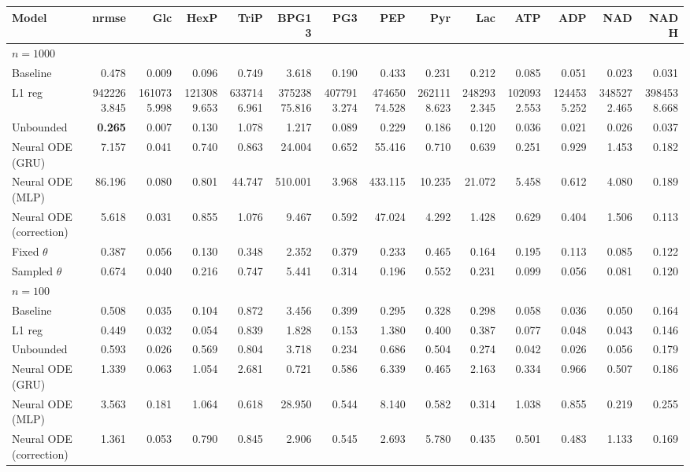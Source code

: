 \begin{tabular}{lrrrrrrrrrrrrr}
\toprule
Model & nrmse & Glc & HexP & TriP & BPG13 & PG3 & PEP & Pyr & Lac & ATP & ADP & NAD & NADH \\
\midrule
\multicolumn{14}{l}{\textbf{$n=1000$}} \\
Baseline & 0.478 & 0.009 & 0.096 & 0.749 & 3.618 & 0.190 & 0.433 & 0.231 & 0.212 & 0.085 & 0.051 & 0.023 & 0.031 \\
L1 reg & 9422263.845 & 1610735.998 & 1213089.653 & 6337146.961 & 37523875.816 & 4077913.274 & 47465074.528 & 2621118.623 & 2482932.345 & 1020932.553 & 1244535.252 & 3485272.465 & 3984538.668 \\
Unbounded & \textbf{0.265} & 0.007 & 0.130 & 1.078 & 1.217 & 0.089 & 0.229 & 0.186 & 0.120 & 0.036 & 0.021 & 0.026 & 0.037 \\
Neural ODE (GRU) & 7.157 & 0.041 & 0.740 & 0.863 & 24.004 & 0.652 & 55.416 & 0.710 & 0.639 & 0.251 & 0.929 & 1.453 & 0.182 \\
Neural ODE (MLP) & 86.196 & 0.080 & 0.801 & 44.747 & 510.001 & 3.968 & 433.115 & 10.235 & 21.072 & 5.458 & 0.612 & 4.080 & 0.189 \\
Neural ODE (correction) & 5.618 & 0.031 & 0.855 & 1.076 & 9.467 & 0.592 & 47.024 & 4.292 & 1.428 & 0.629 & 0.404 & 1.506 & 0.113 \\
Fixed $\theta$ & 0.387 & 0.056 & 0.130 & 0.348 & 2.352 & 0.379 & 0.233 & 0.465 & 0.164 & 0.195 & 0.113 & 0.085 & 0.122 \\
Sampled $\theta$ & 0.674 & 0.040 & 0.216 & 0.747 & 5.441 & 0.314 & 0.196 & 0.552 & 0.231 & 0.099 & 0.056 & 0.081 & 0.120 \\
\midrule
\multicolumn{14}{l}{\textbf{$n=100$}} \\
Baseline & 0.508 & 0.035 & 0.104 & 0.872 & 3.456 & 0.399 & 0.295 & 0.328 & 0.298 & 0.058 & 0.036 & 0.050 & 0.164 \\
L1 reg & 0.449 & 0.032 & 0.054 & 0.839 & 1.828 & 0.153 & 1.380 & 0.400 & 0.387 & 0.077 & 0.048 & 0.043 & 0.146 \\
Unbounded & 0.593 & 0.026 & 0.569 & 0.804 & 3.718 & 0.234 & 0.686 & 0.504 & 0.274 & 0.042 & 0.026 & 0.056 & 0.179 \\
Neural ODE (GRU) & 1.339 & 0.063 & 1.054 & 2.681 & 0.721 & 0.586 & 6.339 & 0.465 & 2.163 & 0.334 & 0.966 & 0.507 & 0.186 \\
Neural ODE (MLP) & 3.563 & 0.181 & 1.064 & 0.618 & 28.950 & 0.544 & 8.140 & 0.582 & 0.314 & 1.038 & 0.855 & 0.219 & 0.255 \\
Neural ODE (correction) & 1.361 & 0.053 & 0.790 & 0.845 & 2.906 & 0.545 & 2.693 & 5.780 & 0.435 & 0.501 & 0.483 & 1.133 & 0.169 \\

\end{tabular}
